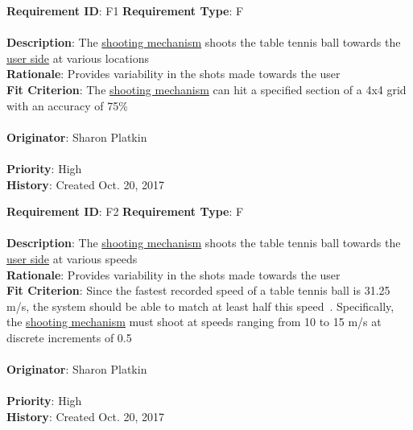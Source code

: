 \documentclass[11pt]{article}
\begin{document}
\begin{framed}
	\noindent\textbf{Requirement ID}: F1 \hfill \textbf{Requirement Type}: F \hfill\\\\
	\noindent\textbf{Description}: The \hyperref[sec:definitions]{shooting mechanism} shoots the table tennis ball towards the \hyperref[sec:definitions]{user side} at various locations \\
	\textbf{Rationale}: Provides variability in the shots made towards the user \\
	\textbf{Fit Criterion}: The \hyperref[sec:definitions]{shooting mechanism} can hit a specified section of a 4x4 grid with an accuracy of 75\%\\\\
	\textbf{Originator}: Sharon Platkin \\\\
	\textbf{Priority}: High \hfill \\
	\noindent\textbf{History}: Created Oct. 20, 2017
\end{framed}

\begin{framed}
	\noindent\textbf{Requirement ID}: F2 \hfill \textbf{Requirement Type}: F \hfill\\\\
	\noindent\textbf{Description}: The \hyperref[sec:definitions]{shooting mechanism} shoots the table tennis ball towards the \hyperref[sec:definitions]{user side} at various speeds \\
	\textbf{Rationale}: Provides variability in the shots made towards the user \\
	\textbf{Fit Criterion}: Since the fastest recorded speed of a table tennis ball is 31.25 m/s, the system should be able to match at least half this speed~\autocite{thoughtco}. Specifically, the \hyperref[sec:definitions]{shooting mechanism} must shoot at speeds ranging from 10 to 15 m/s at discrete increments of 0.5 \\\\
	\textbf{Originator}: Sharon Platkin \\\\
	\textbf{Priority}: High \hfill \\
	\noindent\textbf{History}: Created Oct. 20, 2017
\end{framed}
\end{document}
